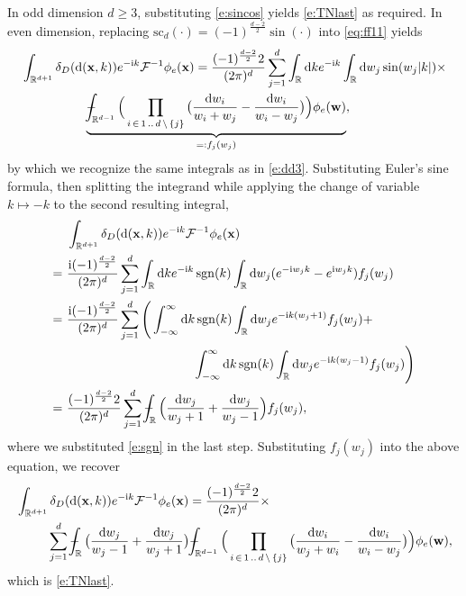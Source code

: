 \documentclass[11pt,A4,twoside]{article}
\numberwithin{equation}{section}
\renewcommand{\vec}{\mathbf}
\newcommand{\intcc}{\dashint}
\newcommand{\Fi}{\mathcal{F}^{-1}}
\renewcommand*\d{\mathop{}\!\mathrm{d}}
\newcommand{\x}{\mathbf{x}}
\newcommand{\w}{\mathbf{w}}
\renewcommand{\sc}{\mathrm{sc}}
\newcommand{\R}{\mathbbm{R}}
\DeclareMathOperator*{\sgn}{sgn}
\def\Phint#1{\mathchoice
  {\XXint\displaystyle\textstyle{#1}}%
  {\XXint\textstyle\scriptstyle{#1}}%
  {\XXint\scriptstyle\scriptscriptstyle{#1}}%
  {\XXint\scriptscriptstyle\scriptscriptstyle{#1}}%
  \!\int}
\def\XXint#1#2#3{{\setbox0=\hbox{$#1{#2#3}{\int}$}
    \vcenter{\hbox{$#2#3$}}\kern-.5\wd0}}
\def\dashint{\Phint-}
\def\qqq{\;\;\;\;\;\;\;\;\;}
\def\bel{\begin{eqnarray*}\begin{aligned}}
\def\eel{\end{aligned}\end{eqnarray*}}
\theoremstyle{definition}
\theoremstyle{remark}
\def\R{\mathbb{R}}
\def\phie{\phi_e}
\def\theS{D}
\def\bigotimes{\prod}
\def\thermi{{\rm i}}%
\begin{document}
{{In odd dimension $d\geq3$, substituting \eqref{e:sincos} yields \eqref{e:TNlast} as required. In even dimension, replacing $\sc_d (\cdot) = (-1)^{\frac{d-2}{2}}\sin(\cdot)$ into \eqref{eq:ff11} yields
\bel
&\int_{\R^{d+1}} \delta_\theS(\d(\vec x, k)) e^{-\thermi  k} \Fi \phie (\x) = \frac{(-1)^{\frac{d-2}{2}}2}{(2\pi)^d} \sum_{j = 1}^{d} \int_{\R} \d k e^{-\thermi k} \int_\R\d w_j \sin(w_j|k|)  \times \\
&\qqq\qqq\underbrace{\intcc_{\R^{d-1}}\Big(\bigotimes_{\jmath\, \in\, 1\,..\,d\, \setminus\,  \{j\}} \big(\frac{\d w_{\jmath}}{w_{\jmath} + w_{j}  }  - \frac{\d w_{\jmath}}{w_{\jmath} - w_{j}}\big)\Big)  \phie(\w)}_{=: f_j(w_j)},
\eel
by which we recognize the same integrals as  in  \eqref{e:dd3}.
Substituting Euler's sine formula, then splitting the integrand while applying the change of variable $k \mapsto -k$ to the second resulting integral,
\bel
 &\int_{\R^{d+1}} \delta_\theS(\d(\vec x, k)) e^{-\thermi k} \Fi \phie (\x) \\
 =\ &  \frac{\thermi(-1)^{\frac{d-2}{2}}}{(2\pi)^d} \sum_{j = 1}^{d}  \int_\R \d k e^{-\thermi k} \sgn(k)\int_\R \d w_j (e^{-\thermi   w_j k}- e^{\thermi  w_j k}) f_j(w_j) 
 \\
  =\ &  \frac{	\thermi(-1)^{\frac{d-2}{2}}}{(2\pi)^d} \sum_{j = 1}^{d} \Bigg(\int_{-\infty}^\infty \d k  \sgn(k)  \int_\R \d w_j e^{-\thermi   k(w_j+1) } f_j(w_j) +\\
  &\qqq\qqq\qqq\qqq \int_{-\infty}^\infty \d k  \sgn(k)  \int_\R \d w_j e^{-\thermi   k(w_j-1) } f_j(w_j)\Bigg) \\
 =\ & \frac{(-1)^{\frac{d-2}{2}}2}{(2\pi)^d} \sum_{j = 1}^{d} 
 \intcc_\R  \Big(\frac{\d w_j}{w_j+1}+\frac{\d w_j}{w_j-1}\Big) f_j(w_j),
\eel
where we substituted \eqref{e:sgn} in the last step. Substituting $f_j(w_j)$ into the above equation, we recover 
\begin{align*}
    & \int_{\R^{d+1}} \delta_\theS(\d(\vec x, k)) e^{-\thermi k} \Fi \phie (\x) =      \frac{(-1)^{\frac{d-2}{2}}2}{(2\pi)^d}\times  \\
    &\qqq \sum_{j = 1}^{d} \intcc_{\R}\big( \frac{\d w_j}{w_{j} - 1} +
  \frac{\d w_j}{w_{j} + 1}\big)\intcc_{\R^{d-1}}\Big(\bigotimes_{\jmath\, \in\, 1\,..\,d\, \setminus\,  \{j\}} \big(\frac{\d w_{\jmath}}{w_{j} + w_{\jmath}}
 -\frac{\d w_{\jmath}}{w_{\jmath} - w_{j}}\big)\Big)  \phie(\w) ,
\end{align*}
which is \eqref{e:TNlast}.
}%


}
\end{document}
